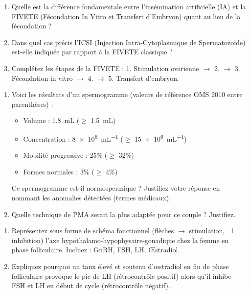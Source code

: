 \documentclass[11pt]{article}
\begin{document}
\begin{exercice}
\begin{enumerate}
    \item Quelle est la différence fondamentale entre l'insémination artificielle (IA) et la FIVETE (Fécondation In Vitro et Transfert d'Embryon) quant au lieu de la fécondation ?
    \item Dans quel cas précis l'ICSI (Injection Intra-Cytoplasmique de Spermatozoïde) est-elle indiquée par rapport à la FIVETE classique ?
    \item Complétez les étapes de la FIVETE : 
    1. Stimulation ovarienne $\rightarrow$ 2. \underline{\hspace{4cm}} $\rightarrow$ 3. Fécondation in vitro $\rightarrow$ 4. \underline{\hspace{4cm}} $\rightarrow$ 5. Transfert d'embryon.
\end{enumerate}
\end{exercice}

\begin{exercice}
\begin{enumerate}
    \item Voici les résultats d'un spermogramme (valeurs de référence OMS 2010 entre parenthèses) :
    \begin{itemize}
        \item Volume : \SI{1.8}{mL} ($\ge$ \SI{1.5}{mL})
        \item Concentration : \SI{8e6}{mL^{-1}} ($\ge$ \SI{15e6}{mL^{-1}})
        \item Mobilité progressive : 25\% ($\ge$ 32\%)
        \item Formes normales : 3\% ($\ge$ 4\%)
    \end{itemize}
    Ce spermogramme est-il normospermique ? Justifiez votre réponse en nommant les anomalies détectées (termes médicaux).
    \item Quelle technique de PMA serait la plus adaptée pour ce couple ? Justifiez.
\end{enumerate}
\end{exercice}

\begin{exercice}
\begin{enumerate}
    \item Représentez sous forme de schéma fonctionnel (flèches $\rightarrow$ stimulation, $\dashv$ inhibition) l'axe hypothalamo-hypophysaire-gonadique chez la femme en phase folliculaire. Incluez : GnRH, FSH, LH, Œstradiol.
    \item Expliquez pourquoi un taux élevé et soutenu d'œstradiol en fin de phase folliculaire provoque le pic de LH (rétrocontrôle positif) alors qu'il inhibe FSH et LH en début de cycle (rétrocontrôle négatif).
\end{enumerate}
\end{exercice}
\end{document}
